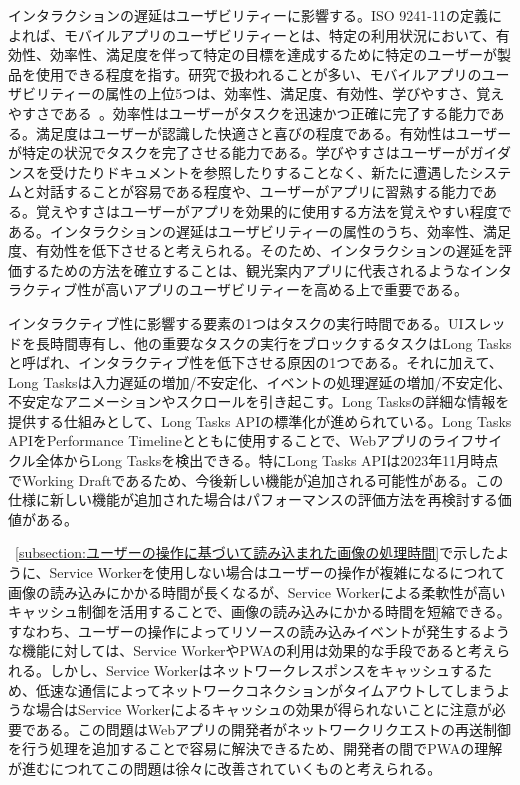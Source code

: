 インタラクションの遅延はユーザビリティーに影響する。ISO 9241-11の定義によれば、モバイルアプリのユーザビリティーとは、特定の利用状況において、有効性、効率性、満足度を伴って特定の目標を達成するために特定のユーザーが製品を使用できる程度を指す。研究で扱われることが多い、モバイルアプリのユーザビリティーの属性の上位5つは、効率性、満足度、有効性、学びやすさ、覚えやすさである~\cite{PawelUsabilityofMobileApplications}。効率性はユーザーがタスクを迅速かつ正確に完了する能力である。満足度はユーザーが認識した快適さと喜びの程度である。有効性はユーザーが特定の状況でタスクを完了させる能力である。学びやすさはユーザーがガイダンスを受けたりドキュメントを参照したりすることなく、新たに遭遇したシステムと対話することが容易である程度や、ユーザーがアプリに習熟する能力である。覚えやすさはユーザーがアプリを効果的に使用する方法を覚えやすい程度である。インタラクションの遅延はユーザビリティーの属性のうち、効率性、満足度、有効性を低下させると考えられる。そのため、インタラクションの遅延を評価するための方法を確立することは、観光案内アプリに代表されるようなインタラクティブ性が高いアプリのユーザビリティーを高める上で重要である。

インタラクティブ性に影響する要素の1つはタスクの実行時間である。UIスレッドを長時間専有し、他の重要なタスクの実行をブロックするタスクはLong Tasksと呼ばれ、インタラクティブ性を低下させる原因の1つである。それに加えて、Long Tasksは入力遅延の増加/不安定化、イベントの処理遅延の増加/不安定化、不安定なアニメーションやスクロールを引き起こす。Long Tasksの詳細な情報を提供する仕組みとして、Long Tasks APIの標準化が進められている。Long Tasks APIをPerformance Timelineとともに使用することで、Webアプリのライフサイクル全体からLong Tasksを検出できる。特にLong Tasks APIは2023年11月時点でWorking Draftであるため、今後新しい機能が追加される可能性がある。この仕様に新しい機能が追加された場合はパフォーマンスの評価方法を再検討する価値がある。

~\autoref{subsection:ユーザーの操作に基づいて読み込まれた画像の処理時間}で示したように、Service Workerを使用しない場合はユーザーの操作が複雑になるにつれて画像の読み込みにかかる時間が長くなるが、Service Workerによる柔軟性が高いキャッシュ制御を活用することで、画像の読み込みにかかる時間を短縮できる。すなわち、ユーザーの操作によってリソースの読み込みイベントが発生するような機能に対しては、Service WorkerやPWAの利用は効果的な手段であると考えられる。しかし、Service Workerはネットワークレスポンスをキャッシュするため、低速な通信によってネットワークコネクションがタイムアウトしてしまうような場合はService Workerによるキャッシュの効果が得られないことに注意が必要である。この問題はWebアプリの開発者がネットワークリクエストの再送制御を行う処理を追加することで容易に解決できるため、開発者の間でPWAの理解が進むにつれてこの問題は徐々に改善されていくものと考えられる。

